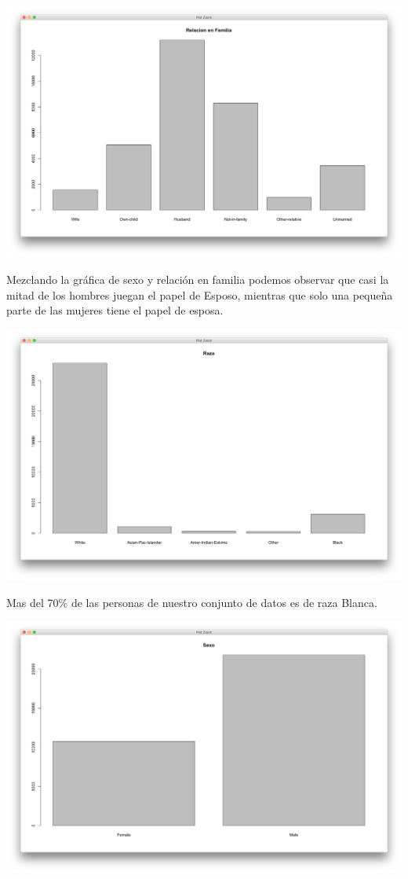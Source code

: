 \documentclass{article}
\begin{document}
  \begin{center}
    \hbox{\hspace{-5.5em}\includegraphics[scale=0.4]{graficas/relfamP}}
  \end{center}
  Mezclando la gráfica de sexo y relación en familia podemos observar que casi la mitad de los hombres juegan el papel de Esposo, mientras que solo una pequeña parte de las mujeres tiene el papel de esposa.
  \begin{center}
    \hbox{\hspace{-5.5em}\includegraphics[scale=0.4]{graficas/razaP}}
  \end{center}
  Mas del 70\% de las personas de nuestro conjunto de datos es de raza Blanca.
  \begin{center}
    \hbox{\hspace{-5.5em}\includegraphics[scale=0.4]{graficas/sexoP}}
  \end{center}
\end{document}
